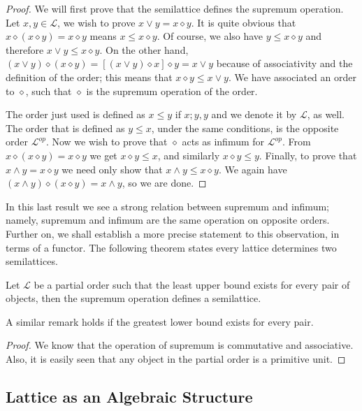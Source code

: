 \documentclass [12pt]{book}
\begin{document}
\begin{proof}We will first prove that the semilattice defines the supremum operation. Let $x, y\in\mathcal L$, we wish to prove $x\vee y=x\diamond y$. It is quite obvious that $x\diamond(x\diamond y)=x\diamond y$ means $x\leq x\diamond y$. Of course, we also have $y\leq x\diamond y$ and therefore $x\vee y\leq x\diamond y$. On the other hand, $(x\vee y)\diamond(x\diamond y)=[(x\vee y)\diamond x]\diamond y=x\vee y$ because of associativity and the definition of the order; this means that $x\diamond y\leq x\vee y$. We have associated an order to $\diamond$, such that $\diamond$ is the supremum operation of the order.

The order just used is defined as $x\leq y$ if $x;y,y$ and we denote it by $\mathcal L$, as well. The order that is defined as $y\leq x$, under the same conditions, is the opposite order $\mathcal L^{op}$. Now we wish to prove that $\diamond$ acts as infimum for $\mathcal L^{op}$. From $x\diamond(x\diamond y)=x\diamond y$ we get $x\diamond y\leq x$, and similarly $x\diamond y\leq y$. Finally, to prove that $x\wedge y=x\diamond y$ we need only show that $x\wedge y\leq x\diamond y$. We again have $(x\wedge y)\diamond(x\diamond y)=x\wedge y$, so we are done.\end{proof}

In this last result we see a strong relation between supremum and infimum; namely, supremum and infimum are the same operation on opposite orders. Further on, we shall establish a more precise statement to this observation, in terms of a functor. The following theorem states every lattice determines two semilattices.

\begin{proposition}Let $\mathcal L$ be a partial order such that the least upper bound exists for every pair of objects, then the supremum operation defines a semilattice.

A similar remark holds if the greatest lower bound exists for every pair.\label{sup12}\end{proposition}

\begin{proof}We know that the operation of supremum is commutative and associative. Also, it is easily seen that any object in the partial order is a primitive unit.\end{proof}

			\subsection{Lattice as an Algebraic Structure}
\end{document}
